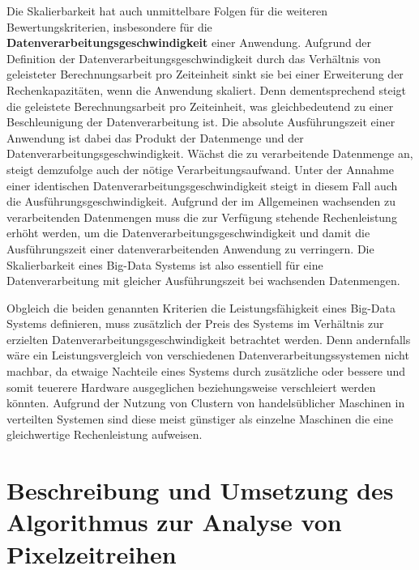Die Skalierbarkeit hat auch unmittelbare Folgen für die weiteren Bewertungskriterien, insbesondere für die \textbf{Datenverarbeitungsgeschwindigkeit} einer Anwendung. Aufgrund der Definition der Datenverarbeitungsgeschwindigkeit durch das Verhältnis von geleisteter Berechnungsarbeit pro Zeiteinheit sinkt sie bei einer Erweiterung der Rechenkapazitäten, wenn die Anwendung skaliert. Denn dementsprechend steigt die geleistete Berechnungsarbeit pro Zeiteinheit, was gleichbedeutend zu einer Beschleunigung der Datenverarbeitung ist. Die absolute Ausführungszeit einer Anwendung ist dabei das Produkt der Datenmenge und der Datenverarbeitungsgeschwindigkeit. Wächst die zu verarbeitende Datenmenge an, steigt demzufolge auch der nötige Verarbeitungsaufwand. Unter der Annahme einer identischen Datenverarbeitungsgeschwindigkeit steigt in diesem Fall auch die Ausführungsgeschwindigkeit. Aufgrund der im Allgemeinen wachsenden zu verarbeitenden Datenmengen muss die zur Verfügung stehende Rechenleistung erhöht werden, um die Datenverarbeitungsgeschwindigkeit und damit die Ausführungszeit einer datenverarbeitenden Anwendung zu verringern. Die Skalierbarkeit eines Big-Data Systems ist also essentiell für eine Datenverarbeitung mit gleicher Ausführungszeit bei wachsenden Datenmengen.

Obgleich die beiden genannten Kriterien die Leistungsfähigkeit eines Big-Data Systems definieren, muss zusätzlich der Preis des Systems im Verhältnis zur erzielten Datenverarbeitungsgeschwindigkeit betrachtet werden. Denn andernfalls wäre ein Leistungsvergleich von verschiedenen Datenverarbeitungssystemen nicht machbar, da etwaige Nachteile eines Systems durch zusätzliche oder bessere und somit teuerere Hardware ausgeglichen beziehungsweise verschleiert werden könnten. Aufgrund der Nutzung von Clustern von handelsüblicher Maschinen in verteilten Systemen sind diese meist günstiger als einzelne Maschinen die eine gleichwertige Rechenleistung aufweisen.


\chapter[Algorithmus zur Analyse von Pixelzeitreihen]{Beschreibung und Umsetzung des Algorithmus zur Analyse von Pixelzeitreihen}
\label{cha:AlgorithmForSatellitePictureAnalysis}
